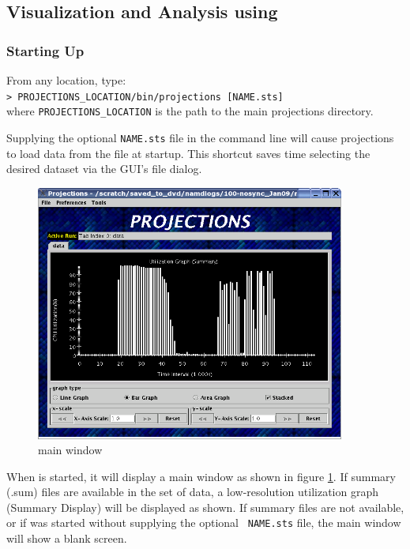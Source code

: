 \documentclass[10pt]{article}
\begin{document}
\subsection{Visualization and Analysis using \projections{}}

\subsubsection{Starting Up}

From any location, type: \\
{\tt > PROJECTIONS\_LOCATION/bin/projections [NAME.sts]} \\
where {\tt PROJECTIONS\_LOCATION} is the path to the main projections
directory.

Supplying the optional {\tt NAME.sts} file in the command line will
cause projections to load data from the file at startup. This shortcut
saves time selecting the desired dataset via the GUI's file dialog.

\begin{figure}[hbt]
\center
\includegraphics[width=4.0in]{fig/front-with-summary}
\caption{\projections{} main window}
\label{mainwindow}
\end{figure}

When \projections{} is started, it will display a main window as shown
in figure \ref{mainwindow}. If summary (.sum) files are available in
the set of data, a low-resolution utilization graph (Summary Display)
will be displayed as shown. If summary files are not available, or if
\projections{} was started without supplying the optional {\tt
NAME.sts} file, the main window will show a blank screen.

\end{document}
